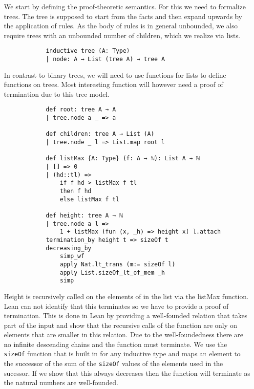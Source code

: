 \documentclass{article}
\begin{document}
        We start by defining the proof-theoretic semantics. For this we need to formalize trees. The tree is supposed to start from the facts and then expand upwards by the application of rules. As the body of rules is in general unbounded, we also require trees with an unbounded number of children, which we realize via lists.

        \begin{lstlisting}
            inductive tree (A: Type)
            | node: A → List (tree A) → tree A        
        \end{lstlisting}

        In contrast to binary trees, we will need to use functions for lists to define functions on trees. Most interesting function will however need a proof of termination due to this tree model. 
        
        \begin{lstlisting}
            def root: tree A → A
            | tree.node a _ => a

            def children: tree A → List (A)
            | tree.node _ l => List.map root l

            def listMax {A: Type} (f: A → ℕ): List A → ℕ
            | [] => 0
            | (hd::tl) => 
                if f hd > listMax f tl 
                then f hd 
                else listMax f tl

            def height: tree A → ℕ
            | tree.node a l => 
                1 + listMax (fun ⟨x, _h⟩ => height x) l.attach
            termination_by height t => sizeOf t
            decreasing_by
                simp_wf
                apply Nat.lt_trans (m:= sizeOf l)
                apply List.sizeOf_lt_of_mem _h
                simp
        \end{lstlisting}
        
        Height is recursively called on the elements of in the list via the listMax function. Lean can not identify that this terminates so we have to provide a proof of termination. This is done in Lean by providing a well-founded relation that takes part of the input and show that the recursive calls of the function are only on elements that are smaller in this relation. Due to the well-foundedness there are no infinite descending chains and the function must terminate.  We use the \texttt{sizeOf} function that is built in for any inductive type and maps an element to the successor of the sum of the \texttt{sizeOf} values of the elements used in the sucessor. If we show that this always decreases then the function will terminate as the natural numbers are well-founded.
\end{document}
